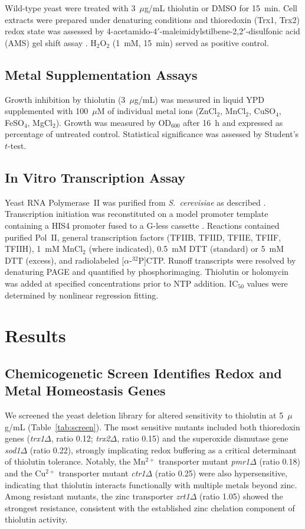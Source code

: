 \documentclass[11pt]{article}
\begin{document}
Wild-type yeast were treated with 3~$\mu$g/mL thiolutin or DMSO for 15~min. Cell extracts were prepared under denaturing conditions and thioredoxin (Trx1, Trx2) redox state was assessed by 4-acetamido-4$'$-maleimidylstilbene-2,2$'$-disulfonic acid (AMS) gel shift assay \citep{berndt2008}. H$_2$O$_2$ (1~mM, 15~min) served as positive control.

\subsection{Metal Supplementation Assays}

Growth inhibition by thiolutin (3~$\mu$g/mL) was measured in liquid YPD supplemented with 100~$\mu$M of individual metal ions (ZnCl$_2$, MnCl$_2$, CuSO$_4$, FeSO$_4$, MgCl$_2$). Growth was measured by OD$_{600}$ after 16~h and expressed as percentage of untreated control. Statistical significance was assessed by Student's $t$-test.

\subsection{In Vitro Transcription Assay}

Yeast RNA Polymerase~II was purified from \textit{S.~cerevisiae} as described \citep{cramer2000}. Transcription initiation was reconstituted on a model promoter template containing a HIS4 promoter fused to a G-less cassette \citep{lorch1997}. Reactions contained purified Pol~II, general transcription factors (TFIIB, TFIID, TFIIE, TFIIF, TFIIH), 1~mM MnCl$_2$ (where indicated), 0.5~mM DTT (standard) or 5~mM DTT (excess), and radiolabeled [$\alpha$-$^{32}$P]CTP. Runoff transcripts were resolved by denaturing PAGE and quantified by phosphorimaging. Thiolutin or holomycin was added at specified concentrations prior to NTP addition. IC$_{50}$ values were determined by nonlinear regression fitting.

\section{Results}

\subsection{Chemicogenetic Screen Identifies Redox and Metal Homeostasis Genes}

We screened the yeast deletion library for altered sensitivity to thiolutin at 5~$\mu$g/mL (Table~\ref{tab:screen}). The most sensitive mutants included both thioredoxin genes (\textit{trx1$\Delta$}, ratio 0.12; \textit{trx2$\Delta$}, ratio 0.15) and the superoxide dismutase gene \textit{sod1$\Delta$} (ratio 0.22), strongly implicating redox buffering as a critical determinant of thiolutin tolerance. Notably, the Mn$^{2+}$ transporter mutant \textit{pmr1$\Delta$} (ratio 0.18) and the Cu$^{2+}$ transporter mutant \textit{ctr1$\Delta$} (ratio 0.25) were also hypersensitive, indicating that thiolutin interacts functionally with multiple metals beyond zinc. Among resistant mutants, the zinc transporter \textit{zrt1$\Delta$} (ratio 1.05) showed the strongest resistance, consistent with the established zinc chelation component of thiolutin activity.
\end{document}
